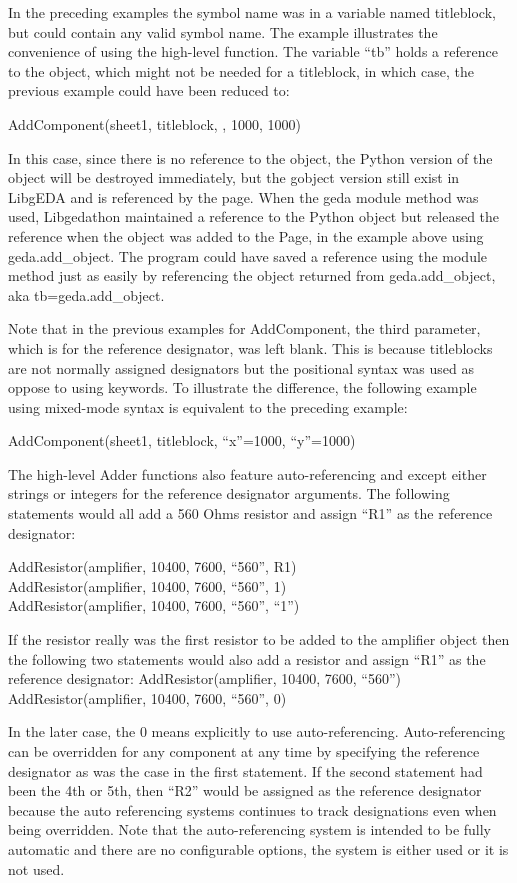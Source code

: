   In the preceding examples the symbol name was in a variable named titleblock, but could contain any valid symbol name. The example illustrates the convenience of using the high-level function. The variable ``tb'' holds a reference to the object, which might not be needed for a titleblock, in which case, the previous example could have been reduced to:

AddComponent(sheet1, titleblock, , 1000, 1000)


  In this case, since there is no reference to the object, the Python version of the object will be destroyed immediately, but the gobject version still exist in LibgEDA and is referenced by the page. When the geda module method was used, Libgedathon maintained a reference to the Python object but released the reference when the object was added to the Page, in the example above using geda.add\_object. The program could have saved a reference using the module method just as easily by referencing the object returned from geda.add\_object, aka tb=geda.add\_object. 


  Note that in the previous examples for AddComponent, the third parameter, which is for the reference designator, was left blank. This is because titleblocks are not normally assigned designators but the positional syntax was used as oppose to using keywords. To illustrate the difference, the following example using mixed-mode syntax is equivalent to the preceding example:

AddComponent(sheet1, titleblock, ``x''=1000, ``y''=1000)


  The high-level Adder functions also feature auto-referencing and except either strings or integers for the reference designator arguments. The following statements would all add a 560 Ohms resistor and assign ``R1'' as the reference designator:

AddResistor(amplifier, 10400, 7600, ``560'', R1)
\\ 
AddResistor(amplifier, 10400, 7600, ``560'', 1)
\\ 
AddResistor(amplifier, 10400, 7600, ``560'', ``1'')


  If the resistor really was the first resistor to be added to the amplifier object then the following two statements would also add a resistor and assign ``R1'' as the reference designator: 
AddResistor(amplifier, 10400, 7600, ``560'')
\\ 
AddResistor(amplifier, 10400, 7600, ``560'', 0)


  In the later case, the 0 means explicitly to use auto-referencing. Auto-referencing can be overridden for any component at any time by specifying the reference designator as was the case in the first statement. If the second statement had been the 4th or 5th, then ``R2'' would be assigned as the reference designator because the auto referencing systems continues to track designations even when being overridden. Note that the auto-referencing system is intended to be fully automatic and there are no configurable options, the system is either used or it is not used. 


